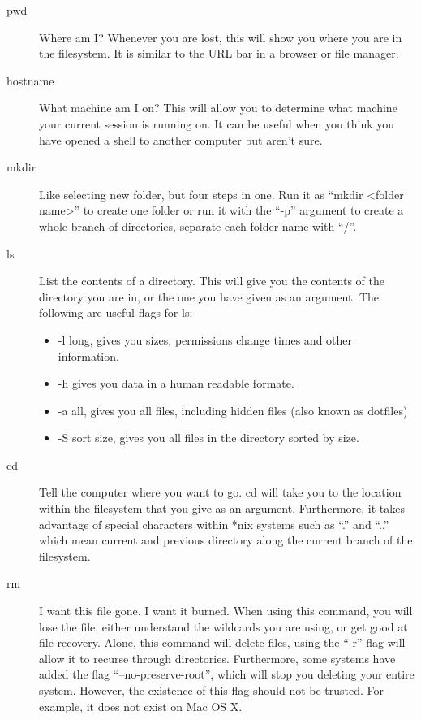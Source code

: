 		\begin{description}
			\item[pwd]
				Where am I?
				Whenever you are lost, this will show you where you are in the filesystem. 
				It is similar to the URL bar in a browser or file manager. 
			\item[hostname]
				What machine am I on?
				This will allow you to determine what machine your current session is running on. 
				It can be useful when you think you have opened a shell to another computer but aren't sure. 
			\item[mkdir]
				Like selecting new folder, but four steps in one. 
				Run it as ``mkdir <folder name>'' to create one folder or run it with the ``-p'' argument to create a whole branch of directories, separate each folder name with ``/''. 
			\item[ls]
				List the contents of a directory.
				This will give you the contents of the directory you are in, or the one you have given as an argument. 
				The following are useful flags for ls:
				\begin{itemize}
					\item -l long, gives you sizes, permissions change times and other information. 
					\item -h gives you data in a human readable formate. 
					\item -a all, gives you all files, including hidden files (also known as dotfiles)
					\item -S sort size, gives you all files in the directory sorted by size. 
				\end{itemize}
			\item[cd]
				Tell the computer where you want to go. 
				cd will take you to the location within the filesystem that you give as an argument. 
				Furthermore, it takes advantage of special characters within \**nix systems such as ``.'' and ``..'' which mean current and previous directory along the current branch of the filesystem. 
			\item[rm]
				I want this file gone. I want it burned. 
				When using this command, you will lose the file, either understand the wildcards you are using, or get good at file recovery. 
				Alone, this command will delete files, using the ``-r'' flag will allow it to recurse through directories. 
				Furthermore, some systems have added the flag ``--no-preserve-root'', which will stop you deleting your entire system. However, the existence of this flag should not be trusted. 
				For example, it does not exist on Mac OS X. 

\end{description}
